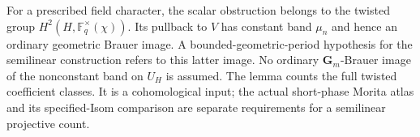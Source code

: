 \begin{remark}
For a prescribed field character, the scalar obstruction
belongs to the twisted group
\(H^2(H,\mathbb F_q^\times(\chi))\).
Its pullback to \(V\) has constant band \(\mu_n\)
and hence an ordinary geometric Brauer image.
A bounded-geometric-period hypothesis for the
semilinear construction refers to this latter image.
No ordinary \(\mathbf G_m\)-Brauer image of the
nonconstant band on \(U_H\) is assumed.
The lemma counts the full twisted coefficient classes.
It is a cohomological input; the actual short-phase
Morita atlas and its specified-Isom comparison are
separate requirements for a semilinear projective count.
\end{remark}
